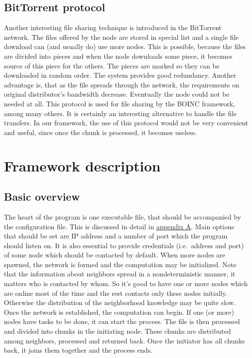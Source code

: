 \subsection{BitTorrent protocol}\label{bittorrent-protocol}

Another interesting file sharing technique is introduced in the
BitTorrent network. The files offered by the node are stored in special
list and a single file download can (and usually do) use more nodes.
This is possible, because the files are divided into pieces and when the
node downloads some piece, it becomes source of this piece for the
others. The pieces are marked so they can be downloaded in random order.
The system provides good redundancy. Another advantage is, that as the
file spreads through the network, the requirements on original
distributor's bandwidth decrease. Eventually the node could not be
needed at all. This protocol is used for file sharing by the BOINC
framework, among many others. It is certainly an interesting alternative
to handle the file transfers. In our framework, the use of this protocol
would not be very convenient and useful, since once the chunk is
processed, it becomes useless.\citep{BitTor}

\section{Framework description}\label{framework-description}

\subsection{Basic overview}\label{basic-overview}

The heart of the program is one executable file, that should be
accompanied by the configuration file. This is discussed in detail in
\hyperref[installation-and-use]{appendix A}. Main options that should be
set are IP address and a number of port which the program should listen
on. It is also essential to provide credentials (i.e.~address and port)
of some node which should be contacted by default. When more nodes are
spawned, the network is formed and the computation may be initialized.
Note that the information about neighbors spread in a nondeterministic
manner, it matters who is contacted by whom. So it's good to have one or
more nodes which are online most of the time and the rest contacts only
these nodes initially. Otherwise the distribution of the neighborhood
knowledge may be quite slow. Once the network is established, the
computation can begin. If one (or more) nodes have tasks to be done, it
can start the process. The file is then processed and divided into
chunks in the initiating node. These chunks are distributed among
neighbors, processed and returned back. Once the initiator has all
chunks back, it joins them together and the process ends.

